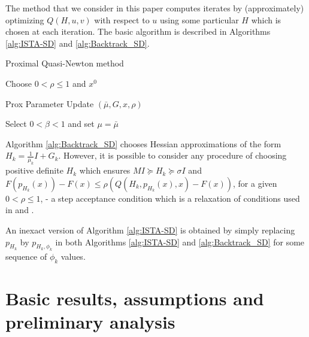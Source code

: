 \documentclass[11pt]{article}
\numberwithin{equation}{section}
\begin{document}
The method that we consider in this paper computes iterates by (approximately) optimizing $Q(H, u,v)$ with respect to $u$ using some particular  $H$  which is chosen at each iteration.
 The basic algorithm is described in Algorithms \ref{alg:ISTA-SD} and \ref{alg:Backtrack_SD}. 
\begin{algorithm2e}\caption{Proximal Quasi-Newton method}
    \label{alg:ISTA-SD}%
{\rm Choose }
$0<\rho\leq 1$ and  $x^0$\; 
\end{algorithm2e}




\begin{algorithm2e}\caption{Prox Parameter Update $(\bar \mu, G, x, \rho)$ }
    \label{alg:Backtrack_SD}%
Select $0<\beta<1$ and set $\mu=\bar \mu$\; 
\end{algorithm2e}




Algorithm \ref{alg:Backtrack_SD}  chooses Hessian approximations of the form $H_k=\frac{1}{\mu_k}I +G_k$. However, it is possible to consider any procedure of choosing positive definite $H_k$ which ensures $M I \succeq H_k\succeq \sigma I$ and 
$F(p_{H_k}(x))- F(x) \leq \rho (Q(H_k, p_{H_k}(x),x)- F(x))$, for a given $0<\rho\leq1$, - a step acceptance condition which is a relaxation of conditions used in  \cite{Beck2009} and \cite{Schmidtetal}.

An inexact version of Algorithm \ref{alg:ISTA-SD}  is obtained by simply replacing $p_{H_k}$ by $p_{H_k, \phi_k}$ in both Algorithms  \ref{alg:ISTA-SD} and \ref{alg:Backtrack_SD} for some sequence of $\phi_k$ values.  

\section{Basic results, assumptions and preliminary analysis}
\label{sec:conv_basic}
\end{document}
